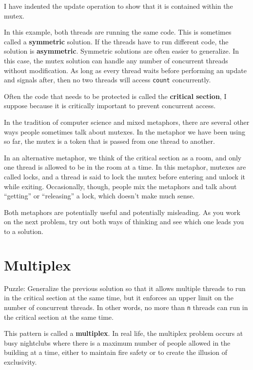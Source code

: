 \documentclass{book}
\begin{document}
I have indented the update operation to show that it is contained
within the mutex.

In this example, both threads are running the same code.  This is
sometimes called a {\bf symmetric} solution.  If the threads have to
run different code, the solution is {\bf asymmetric}.  Symmetric
solutions are often easier to generalize.  In this case, the mutex
solution can handle any number of concurrent threads without
modification.  As long as every thread waits before 
performing an update and signals after, then no two threads
will access {\tt count} concurrently.

Often the code that needs to be protected is called the
{\bf critical section}, I suppose because it is critically
important to prevent concurrent access.

In the tradition of computer science and mixed metaphors, there
are several other ways people sometimes talk about mutexes.  In
the metaphor we have been using so far, the mutex is a token
that is passed from one thread to another.

In an alternative
metaphor, we think of the critical section as a room, and
only one thread is allowed to be in the room at a time.
In this metaphor, mutexes are called locks, and a thread
is said to lock the mutex before entering and unlock it while
exiting.  Occasionally, though, people mix the metaphors and
talk about ``getting'' or ``releasing'' a lock, which doesn't
make much sense.

Both metaphors are potentially useful and potentially misleading.
As you work on the next problem, try out both ways of thinking
and see which one leads you to a solution.


\section{Multiplex}

Puzzle: Generalize the previous solution so that it allows multiple
threads to run in the critical section at the same time, but it
enforces an upper limit on the number of concurrent threads.  In other
words, no more than {\tt n} threads can run in the critical section at
the same time.

This pattern is called a {\bf multiplex}.  In real life, the multiplex
problem occurs at busy nightclubs where there is a maximum number of
people allowed in the building at a time, either to maintain fire
safety or to create the illusion of exclusivity.
\end{document}
